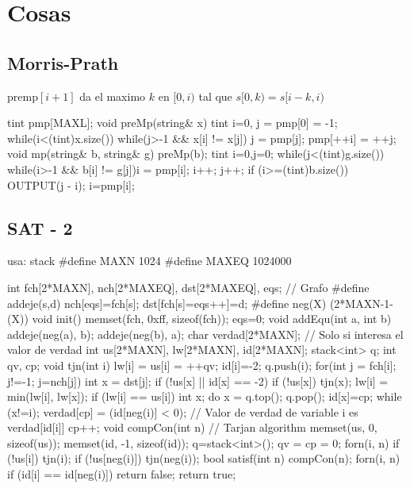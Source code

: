 \documentclass[10pt,landscape,twocolumn,a4paper,notitlepage]{article}
\begin{document}
\section{Cosas}\subsection{Morris-Prath}
premp$[i+1]$ da el maximo $k$ en $[0,i)$ tal que $s[0,k) = s[i-k,i)$
\begin{code}
tint pmp[MAXL];
void preMp(string& x){
  tint i=0, j = pmp[0] = -1;
  while(i<(tint)x.size()){
    while(j>-1 && x[i] != x[j]) j = pmp[j];
      pmp[++i] = ++j;
  }
}
void mp(string& b, string& g){
  preMp(b);
  tint i=0,j=0;
  while(j<(tint)g.size()){
    while(i>-1 && b[i] != g[j]){i = pmp[i];}
    i++; j++;
    if (i>=(tint)b.size()){
      OUTPUT(j - i);
      i=pmp[i];
    }
  }
}
\end{code}
\subsection{SAT - 2}
\begin{code}
usa: stack
#define MAXN 1024
#define MAXEQ 1024000

int fch[2*MAXN], nch[2*MAXEQ], dst[2*MAXEQ], eqs; // Grafo
#define addeje(s,d) { nch[eqs]=fch[s]; dst[fch[s]=eqs++]=d; }
#define neg(X) (2*MAXN-1-(X))
void init() {
	memset(fch, 0xff, sizeof(fch));
	eqs=0;
}
void addEqu(int a, int b) {
	addeje(neg(a), b);
	addeje(neg(b), a);
}
char verdad[2*MAXN]; // Solo si interesa el valor de verdad
int us[2*MAXN], lw[2*MAXN], id[2*MAXN];
stack<int> q; int qv, cp;
void tjn(int i) {
	lw[i] = us[i] = ++qv;
	id[i]=-2; q.push(i);
	for(int j = fch[i]; j!=-1; j=nch[j]) { int x = dst[j];
		if (!us[x] || id[x] == -2) {
			if (!us[x]) tjn(x);
			lw[i] = min(lw[i], lw[x]);
		}
	}
	if (lw[i] == us[i]) {
		int x; do { x = q.top(); q.pop(); id[x]=cp; } while (x!=i);
        verdad[cp] = (id[neg(i)] < 0); // Valor de verdad de variable i es verdad[id[i]]
		cp++;
	}
}
void compCon(int n) { // Tarjan algorithm
	memset(us, 0, sizeof(us));
	memset(id, -1, sizeof(id));
	q=stack<int>(); qv = cp = 0;
	forn(i, n) {
		if (!us[i]) tjn(i);
		if (!us[neg(i)]) tjn(neg(i));
	}
}
bool satisf(int n) {
	compCon(n);
	forn(i, n) if (id[i] == id[neg(i)]) return false;
	return true;
}
\end{code}
\end{document}
